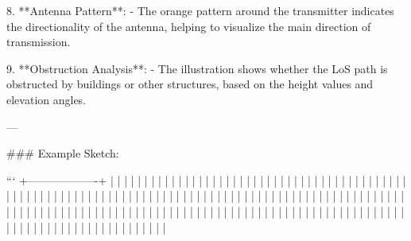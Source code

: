 8. **Antenna Pattern**:
   - The orange pattern around the transmitter indicates the directionality of the antenna, helping to visualize the main direction of transmission.

9. **Obstruction Analysis**:
   - The illustration shows whether the LoS path is obstructed by buildings or other structures, based on the height values and elevation angles.

---

### Example Sketch:

```
+-------------------+
|                   |
|                   |
|                   |
|                   |
|                   |
|                   |
|                   |
|                   |
|                   |
|                   |
|                   |
|                   |
|                   |
|                   |
|                   |
|                   |
|                   |
|                   |
|                   |
|                   |
|                   |
|                   |
|                   |
|                   |
|                   |
|                   |
|                   |
|                   |
|                   |
|                   |
|                   |
|                   |
|                   |
|                   |
|                   |
|                   |
|                   |
|                   |
|                   |
|                   |
|                   |
|                   |
|                   |
|                   |
|                   |
|                   |
|                   |
|                   |
|                   |
|                   |
|                   |
|                   |
|                   |
|                   |
|                   |
|                   |
|                   |
|                   |
|                   |
|                   |
|                   |
|                   |
|                   |
|                   |
|                   |
|                   |
|                   |
|                   |
|                   |
|                   |
|                   |
|                   |
|                   |
|                   |
|                   |
|                   |
|                   |
|                   |
|                   |
|                   |
|                   |
|                   |
|                   |
|                   |
|                   |
|                   |
|                   |
|                   |
|                   |
|                   |
|                   |
|                   |
|                   |
